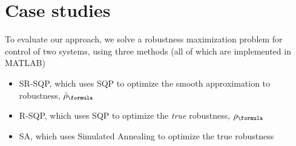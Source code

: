 \section{Case studies}
\label{sec:case study}

To evaluate our approach, we solve a robustness maximization problem for control of two systems, using three methods (all of which are implemented in MATLAB)

\begin{itemize}
	\vspace{-5pt}
	\item SR-SQP, which uses SQP to optimize the smooth approximation to robustness, $\srobf$
	\vspace{-5pt}
	\item R-SQP, which uses SQP to optimize the \textit{true} robustness, $\robf$
	\vspace{-5pt}
	\item SA, which uses Simulated Annealing to optimize the true robustness
	\vspace{-5pt}
\end{itemize}



